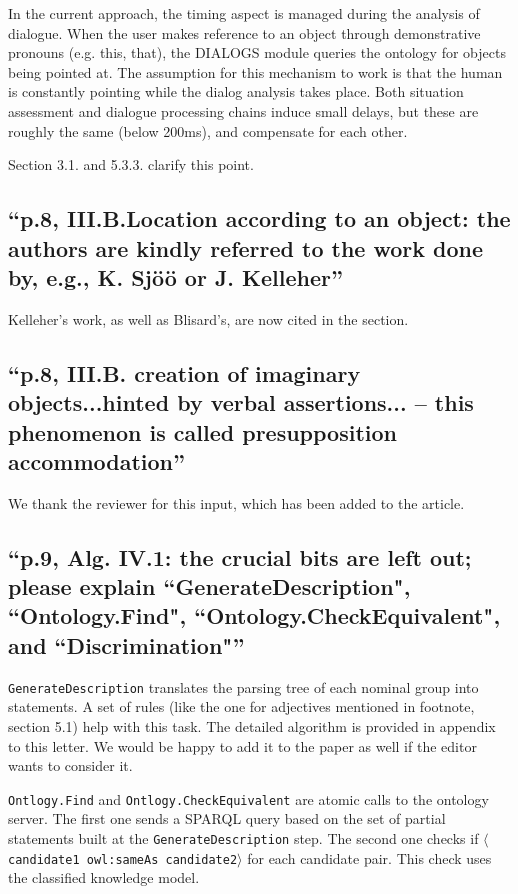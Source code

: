 \documentclass[11pt]{article}
\begin{document}
In the current approach, the timing aspect is managed during the analysis of
dialogue. When the user makes reference to an object through demonstrative pronouns
(e.g. this, that), the DIALOGS module queries the ontology for objects being
pointed at. The assumption for this mechanism to work is that the human is
constantly pointing while the dialog analysis takes place.  Both situation
assessment and dialogue processing chains induce small delays, but these are
roughly the same (below 200ms), and compensate for each other. 

Section 3.1. and 5.3.3. clarify this point. 

\subsection{``p.8, III.B.Location according to an object: the authors are
kindly referred to the work done by, e.g., K. Sj\"o\"o or J. Kelleher''}

Kelleher's work, as well as Blisard's, are now cited in the section.

\subsection{``p.8, III.B. creation of imaginary objects...hinted by verbal
assertions... -- this phenomenon is called presupposition accommodation''}

We thank the reviewer for this input, which has been added to the article.

\subsection{``p.9, Alg. IV.1: the crucial bits are left out; please explain
``GenerateDescription", ``Ontology.Find", ``Ontology.CheckEquivalent", and
``Discrimination"''}

{\tt GenerateDescription} translates the parsing tree of each nominal group
into statements. A set of rules (like the one for adjectives mentioned 
in footnote, section 5.1) help with this task. The detailed algorithm is provided in appendix to this letter.  We would be happy to add it to the paper as well if the editor wants to consider it.

{\tt Ontlogy.Find} and {\tt Ontlogy.CheckEquivalent} are atomic calls to
the ontology server. The first one sends a SPARQL query based on the set of 
partial statements built at the {\tt GenerateDescription} step. The second
one checks if {\tt $\langle$candidate1 owl:sameAs candidate2$\rangle$} for each candidate pair.
This check uses the classified knowledge model.
\end{document}
